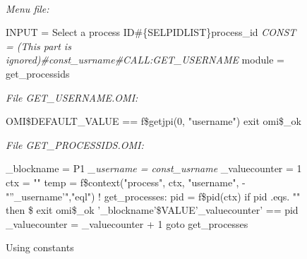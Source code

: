 \documentclass[a4paper]{book}
\renewcommand{\indent}{\hspace*{5mm}}
\begin{document}
\begin{figure}[h!tb]
\begin{minipage}[h!tb]{\textwidth}
\hrulefill \\
\textsl{Menu file:} \newline
\begin{ttfamily}
 \newline
\indent INPUT = Select a process ID{\#}{\{}SEL\textbar PIDLIST{\}}process{\_}id\newline
\indent\textit{CONST = (This part is ignored){\#}const{\_}usrname{\#}CALL:GET{\_}USERNAME}\newline
\noindent[PIDLIST] \newline
\indent module = get{\_}processids \newline
\end{ttfamily}

\textsl{File GET{\_}USERNAME.OMI:} \newline
\begin{ttfamily}
\noindent{\$} OMI{\$}DEFAULT{\_}VALUE == f{\$}getjpi(0, "username")\newline
\noindent{\$} exit omi{\$}{\_}ok \newline
\end{ttfamily}

\textsl{File GET{\_}PROCESSIDS.OMI:} \newline
\begin{ttfamily}
\noindent{\$} {\_}blockname = P1 \newline
\textit{\noindent{\$} {\_}username = const{\_}usrname} \newline
\noindent{\$} {\_}valuecounter = 1 \newline
\noindent{\$} ctx = "" \newline
\noindent{\$} temp = f{\$}context("process", ctx, "username", - \newline
\hspace*{5mm}    "''{\_}username'","eql") \newline
\noindent{\$}! \newline
\noindent{\$}get{\_}processes: \newline
\noindent{\$} pid = f{\$}pid(ctx) \newline
\noindent{\$} if pid .eqs. "" then {\$} exit omi{\$}{\_}ok \newline
\noindent{\$} '{\_}blockname'{\$}VALUE'{\_}valuecounter' == pid \newline
\noindent{\$} {\_}valuecounter = {\_}valuecounter + 1 \newline
\noindent{\$} goto get{\_}processes \newline
\end{ttfamily}
\caption{Using constants}\label{fig:usingconstants}
\hrulefill
\end{minipage}
\end{figure}
\end{document}

